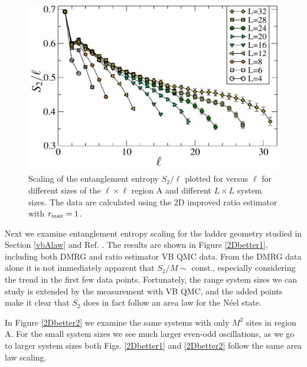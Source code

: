 \begin{figure} {
	\includegraphics[width=5in]{./figures/paper2/fig_AreaL/fig4.pdf} 
	\centering
	\caption[Area law for $S_2$ in the N\'eel state]{
Scaling of the entanglement entropy $S_2/\ell$ plotted for versus $\ell$ for different sizes of the $\ell \times \ell$ region A and different $L \times L$ system sizes. 
The data are calculated using the 2D improved ratio estimator  with $r_{\rm max} = 1$.
	\label{2Darea}
	}
} \end{figure}

Next we examine entanglement entropy scaling for the ladder geometry studied in Section \ref{vbAlaw} and Ref. \cite{PRL1}.
The results are shown in Figure \ref{2Dbetter1}, including both DMRG and ratio estimator VB QMC data.  
From the DMRG data alone it is not immediately apparent that $S_2/M \sim$ const., especially considering the trend in the first few data points. 
Fortunately, the range system sizes we can study is extended by the \swa measurement with VB QMC, and the added points make it clear that $S_2$ does in fact follow an area law for the N\'eel state.

In Figure \ref{2Dbetter2} we examine the same systems with only $M^2$ sites in region A.
For the small system sizes we see much larger even-odd oscillations, as we go to larger system sizes both Figs. \ref{2Dbetter1} and \ref{2Dbetter2} follow the same area law scaling.


